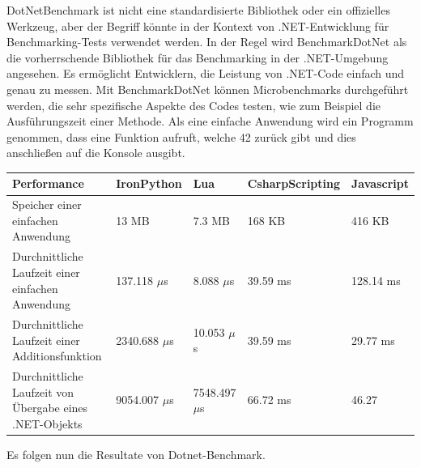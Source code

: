 DotNetBenchmark ist nicht eine standardisierte Bibliothek oder ein offizielles Werkzeug, aber der Begriff könnte in der Kontext von .NET-Entwicklung für Benchmarking-Tests verwendet werden. In der Regel wird BenchmarkDotNet als die vorherrschende Bibliothek für das Benchmarking in der .NET-Umgebung angesehen. Es ermöglicht Entwicklern, die Leistung von .NET-Code einfach und genau zu messen. 
Mit BenchmarkDotNet können Microbenchmarks durchgeführt werden, die sehr spezifische Aspekte des Codes testen, wie zum Beispiel die Ausführungszeit einer Methode.
Als eine einfache Anwendung wird ein Programm genommen, dass eine Funktion aufruft, welche 42 zurück gibt 
und dies anschließen auf die Konsole ausgibt.
\begin{table}[H]
    \begin{tabular}{|p{3cm}|p{3cm}|p{3cm}|p{3cm}|p{3cm}|}
        \hline
        Performance & IronPython & Lua & CsharpScripting & Javascript\\ \hline
        Speicher einer einfachen Anwendung & 13 MB & 7.3 MB & 168 KB & 416 KB  \\ \hline
        Durchnittliche Laufzeit einer einfachen Anwendung & 137.118 $\mu$s & 8.088 $\mu$s & 39.59 ms & 128.14 ms\\ \hline
        Durchnittliche Laufzeit einer Additionsfunktion & 2340.688 $\mu$s & 10.053 $\mu$s &39.59 ms &  29.77 ms \\ \hline
        Durchnittliche Laufzeit von Übergabe eines .NET-Objekts & 9054.007 $\mu$s & 7548.497 $\mu$s &  66.72 ms & 46.27  \\ \hline
    \end{tabular}
\end{table}

\newpage
Es folgen nun die Resultate von Dotnet-Benchmark. \\


